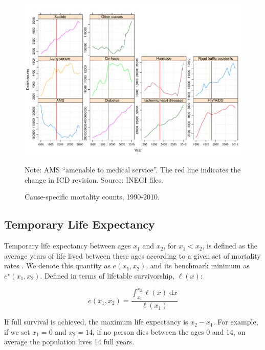 \documentclass[11.5pt]{article}
\newcommand{\dd}{\; \mathrm{d}}
\begin{document}
{\begin{figure}
\centering
\caption{Cause-specific mortality counts, 1990-2010.}
\label{fig:ClassSens}
\includegraphics[scale=.6]{Figures/Class_fig.pdf}

Note: AMS ``amenable to medical service''. The red line indicates the change in ICD revision. Source: INEGI files. 
\end{figure}



\subsection*{Temporary Life Expectancy}
Temporary life expectancy between ages
$x_1$ and $x_2$, for $x_1<x_2$, is defined as the average years of life lived between these ages according to a given set of mortality rates \citep{arriaga1984}. We denote this quantity as
$e(x_1,x_2)$, and its benchmark minimum as $e^{\star}(x_1,x_2)$. Defined in
terms of lifetable survivorship, $\ell(x)$:

\begin{equation}
e(x_1,x_2) = \frac{\int _{x_1}^{x_2} \ell(x) \dd x}{\ell(x_1)}
\end{equation}

If full survival is achieved, the maximum life expectancy is $x_2-x_1$.  For example, if we set $x_1=0$ and $x_2=14$, if no person dies between the ages 0 and 14, on average the population lives 14 full years.


}
\end{document}
